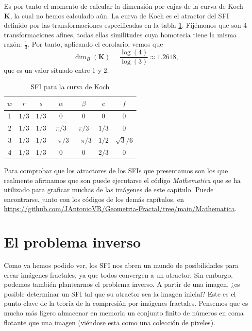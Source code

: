 Es por tanto el momento de calcular la dimensión por cajas de la curva de Koch \textbf{K}, la cual no hemos calculado aún. La curva de Koch es el atractor del SFI definido por las transformaciones especificadas en la tabla \ref{tabla:curva-koch}. Fijémonos que son $4$ transformaciones afines, todas ellas similitudes cuya homotecia tiene la misma razón: $\frac{1}{3}$. Por tanto, aplicando el corolario, vemos que
$$
\dim_B(\mathbf{K})=\dfrac{\log(4)}{\log(3)} \approx 1.2618,
$$
que es un valor situado entre 1 y 2.

\begin{table}[ht]
    \centering
    \begin{tabular}{c|cccccc} \hline
        $w$ & $r$ & $s$ & $\alpha$ & $\beta$ & $e$ & $f$ \\ \hline\hline
    1 & $1/3$ & $1/3$ & 0 & 0 & 0 & 0 \\ \hline
    2 & $1/3$ & $1/3$ & $\pi/3$ & $\pi/3$ & $1/3$ & 0 \\ \hline
    3 & $1/3$ & $1/3$ & $-\pi/3$ & $-\pi/3$ & $1/2$ & $\sqrt{3}/6$ \\ \hline
    4 & $1/3$ & $1/3$ & 0 & 0 & $2/3$ & 0 \\ \hline
    \end{tabular}
    \caption{SFI para la curva de Koch}
    \label{tabla:curva-koch}
\end{table}

Para comprobar que los atractores de los SFIs que presentamos son los que realmente afirmamos que son puede ejecutarse el código \textit{Mathematica} que se ha utilizado para graficar muchas de las imágenes de este capítulo. Puede encontrarse, junto con los códigos de los demás capítulos, en \url{https://github.com/JAntonioVR/Geometria-Fractal/tree/main/Mathematica}.


\section{El problema inverso}
\label{section:problema-inverso}

Como ya hemos podido ver, los SFI nos abren un mundo de posibilidades para crear imágenes fractales, ya que todos convergen a un atractor. Sin embargo, podemos también plantearnos el problema inverso. A partir de una imagen, ¿es posible determinar un SFI tal que su atractor sea la imagen inicial? Este es el punto clave de la teoría de la compresión por imágenes fractales. Pensemos que es mucho más ligero almacenar en memoria un conjunto finito de números en coma flotante que una imagen (viéndose esta como una colección de píxeles).

